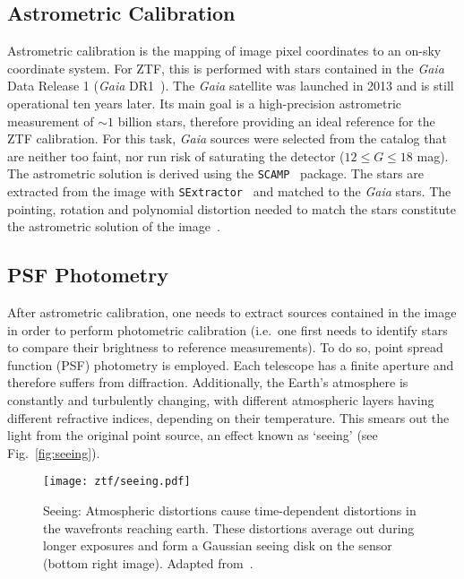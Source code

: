 \subsection{Astrometric Calibration}
Astrometric calibration is the mapping of image pixel coordinates to an on-sky coordinate system. For ZTF, this is performed with stars contained in the \textit{Gaia} Data Release 1 (\textit{Gaia} DR1~). The \textit{Gaia} satellite was launched in 2013 and is still operational ten years later. Its main goal is a high-precision astrometric measurement of $\sim1$ billion stars, therefore providing an ideal reference for the ZTF calibration. For this task, \textit{Gaia} sources were selected from the catalog that are neither too faint, nor run risk of saturating the detector ($12 \leq G \leq 18$ mag). The astrometric solution is derived using the \texttt{SCAMP}~ package. The stars are extracted from the image with \texttt{SExtractor}~ and matched to the \textit{Gaia} stars. The pointing, rotation and polynomial distortion needed to match the stars constitute the astrometric solution of the image~.

\subsection{PSF Photometry}\label{psfphot}
After astrometric calibration, one needs to extract sources contained in the image in order to perform photometric calibration (i.e.\ one first needs to identify stars to compare their brightness to reference measurements). To do so, point spread function (PSF) photometry is employed. Each telescope has a finite aperture and therefore suffers from diffraction. Additionally, the Earth's atmosphere is constantly and turbulently changing, with different atmospheric layers having different refractive indices, depending on their temperature. This smears out the light from the original point source, an effect known as `seeing' (see Fig.~\ref{fig:seeing}).

\begin{figure}[h!]
    \texttt{[image: ztf/seeing.pdf]}
    \caption[Seeing]{Seeing: Atmospheric distortions cause time-dependent distortions in the wavefronts reaching earth. These distortions average out during longer exposures and form a Gaussian seeing disk on the sensor (bottom right image). Adapted from~\cite{Chromey2016}.}
\end{figure}

